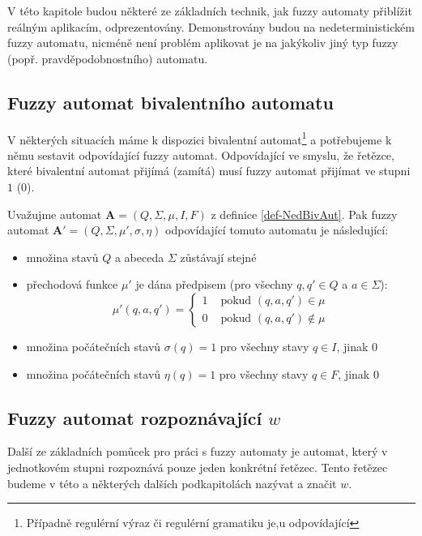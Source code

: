 V této kapitole budou některé ze základních technik, jak fuzzy automaty přiblížit reálným aplikacím, odprezentovány. Demonstrovány budou na nedeterministickém fuzzy automatu, nicméně není problém aplikovat je na jakýkoliv jiný typ fuzzy (popř. pravděpodobnostního) automatu.

\subsection{Fuzzy automat bivalentního automatu}
V některých situacích máme k dispozici  bivalentní automat\footnote{Případně regulérní výraz či regulérní gramatiku je,u odpovídající} a potřebujeme k němu sestavit odpovídající fuzzy automat. Odpovídající ve smyslu, že řetězce, které bivalentní automat přijímá (zamítá) musí fuzzy automat přijímat ve stupni $1$ ($0$).

Uvažujme automat $\mathbf{A} = (Q, \Sigma, \mu, I, F)$ z definice \ref{def-NedBivAut}. Pak fuzzy automat $\mathbf{A}' = (Q, \Sigma, \mu', \sigma, \eta)$ odpovídající tomuto automatu je následující:
\begin{itemize}
 \item množina stavů $Q$ a abeceda $\Sigma$ zůstávají stejné
 \item přechodová funkce $\mu'$ je dána předpisem (pro všechny $q, q' \in Q$ a $a \in \Sigma$):
 $$
  \mu'(q, a, q') = 
    \begin{cases}
     1 & \text{ pokud $(q, a, q') \in \mu$} \\
     0 & \text{ pokud $(q, a, q') \notin \mu$}
    \end{cases}
 $$
 \item množina počátečních stavů $\sigma(q) = 1$ pro všechny stavy $q \in I$, jinak $0$
 \item množina počátečních stavů $\eta(q) = 1$ pro všechny stavy $q \in F$, jinak $0$
\end{itemize}

\subsection{Fuzzy automat rozpoznávající $w$} \label{sec:FuzAutRozpOme}
Další ze základních pomůcek pro práci s fuzzy automaty je automat, který v jednotkovém stupni rozpoznává pouze jeden konkrétní řetězec. Tento řetězec budeme v této a některých dalších podkapitolách nazývat  a značit $w$.

